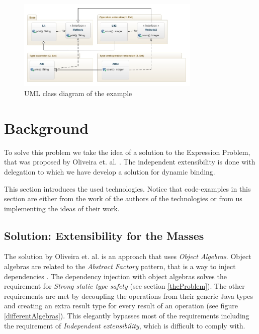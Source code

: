 \documentclass{report}
\begin{document}
\begin{figure}[H]

\includegraphics[width=330px,keepaspectratio=true]{Expression_problem-diag.jpg}

\caption{UML class diagram of the example}
\label{exampleClassDiagram}
\end{figure}

\section{Background}

To solve this problem we take the idea of a solution to the Expression Problem, that was proposed by Oliveira et. al. \cite{Oliv-Extensibility-2012}. The independent extensibility is done with delegation to which we have develop a solution for dynamic binding.

This section introduces the used technologies. Notice that code-examples in this section are either from the work of the authors of the technologies or from us implementing the ideas of their work.


\subsection{Solution: Extensibility for the Masses}

The solution by Oliveira et. al. \cite{Oliv-Extensibility-2012} is an approach that uses \emph{Object Algebras}. Object algebras are related to the \emph{Abstract Factory} pattern, that is a way to inject dependencies \cite{Gof-Design-1993}. The dependency injection with object algebras solves the requirement for \emph{Strong static type safety} (see section \ref{theProblem}). The other requirements are met by decoupling the operations from their generic Java types and creating an extra result type for every result of an operation (see figure \ref{differentAlgebras}). This elegantly bypasses most of the requirements including the requirement of \emph{Independent extensibility}, which is difficult to comply with.
\end{document}
